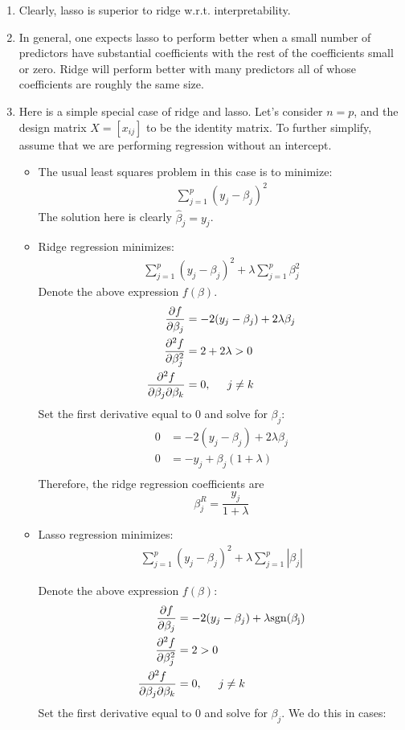 \documentclass[10pt]{article}
\begin{document}
\begin{enumerate}
	\item Clearly, lasso is superior to ridge w.r.t. interpretability.
	\item In general, one expects lasso to perform better when a small number of predictors have substantial coefficients with the rest of the coefficients small or zero.  Ridge will perform better with many predictors all of whose coefficients are roughly the same size.  
	\item Here is a simple special case of ridge and lasso.  Let's consider $n = p$, and the design matrix $X = [x_{ij}]$ to be the identity matrix.  To further simplify, assume that we are performing regression without an intercept.  \begin{itemize}
		\item The usual least squares problem in this case is  to minimize:
		\begin{align*}
			\sum_{j = 1}^p (y_j - \beta_j)^2
		\end{align*}
		The solution here is clearly $\hat \beta_j = y_j$.
		\item Ridge regression minimizes:
		\begin{align*}
			\sum_{j = 1}^p (y_j - \beta_j)^2 + \lambda\sum_{j = 1}^p \beta_j^2
		\end{align*}
		{\color{brown} Denote the above expression $f(\beta)$.
		\begin{align*}
			\dfrac{\partial f}{\partial \beta_j} &= -2(y_j - \beta_j) + 2\lambda \beta_j \\
			\dfrac{\partial^2 f}{\partial \beta_j^2} &= 2 + 2\lambda > 0\\
			\dfrac{\partial^2 f}{\partial \beta_j \partial \beta_k} &= 0, \hspace{.2in} j \neq k 
		\end{align*} 
		Set the first derivative equal to 0 and solve for $\beta_j$: 
		\begin{align*}
			0 &= -2(y_j - \beta_j) + 2\lambda \beta_j \\ 
			0 &= -y_j + \beta_j(1 + \lambda) \\ 
		\end{align*} } 
		Therefore, the ridge regression coefficients are $$\beta^R_j = \dfrac{y_j}{1 + \lambda}$$
		
		\item Lasso regression minimizes: 
		\begin{align*}
			\sum_{j = 1}^p (y_j - \beta_j)^2 + \lambda\sum_{j = 1}^p |\beta_j|
		\end{align*}
		{\color{brown} Denote the above expression $f(\beta)$: 
		\begin{align*}
			\dfrac{\partial f}{\partial \beta_j} &= -2(y_j - \beta_j) + \lambda \mathrm{sgn(\beta_j)} \\
			\dfrac{\partial^2 f}{\partial \beta_j^2} &= 2 > 0\\
			\dfrac{\partial^2 f}{\partial \beta_j \partial \beta_k} &= 0, \hspace{.2in} j \neq k 
		\end{align*}
		Set the first derivative equal to 0 and solve for $\beta_j$.  We do this in cases:
		
}
\end{itemize}
\end{enumerate}
\end{document}
